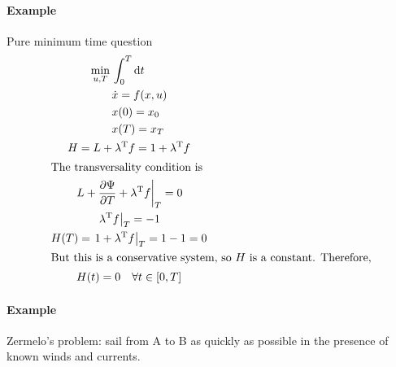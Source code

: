 \documentclass[letterpaper,12pt,titlepage]{report}
\newcommand*\dif{\mathop{}\!\mathrm{d}}
\newcommand{\trans}{^\text{T}}
\newcommand*\pder[2]{\frac{\partial #1}{\partial #2}}
\theoremstyle{plain}
\theoremstyle{definition}
\begin{document}
\paragraph{Example} Pure minimum time question
\begin{gather}
  \begin{aligned}
    \min_{u,T} {} & \int_0^T \dif t \\
    & \dot x = f(x,u) \\
    & x(0) = x_0 \\
    & x(T) = x_T
  \end{aligned} \\
  H = L + \lambda\trans f = 1 + \lambda\trans f \\
  \shortintertext{The transversality condition is}
  \left. L + \pder{\Psi}{T} + \lambda\trans f \right|_T = 0 \\
  \left. \lambda\trans f \right|_T = -1 \\
  H(T) = \left. 1 + \lambda\trans f \right|_T = 1 - 1 = 0 \\
  \shortintertext{But this is a conservative system, so $H$ is a constant. Therefore,}
  H(t) = 0 \quad \forall t\in[0,T]
\end{gather}

\clearpage
\paragraph{Example} Zermelo's problem: sail from A to B as quickly as possible in the presence of known winds and currents.
\end{document}
